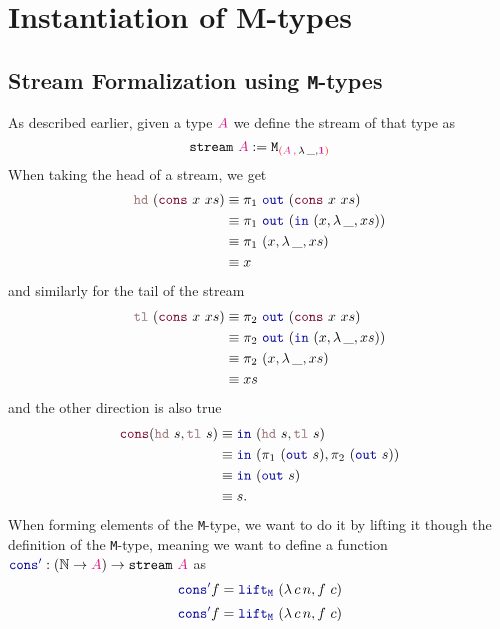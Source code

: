 \documentclass[twoside,11pt,openright]{report}
\theoremstyle{plain} %
\theoremstyle{definition}
\theoremstyle{remark}
\newcommand*{\type}[1]{\textcolor{magenta!90!black}{#1}}
\newcommand*{\containerpair}[2]{\textcolor{red}{(}#1\,\textcolor{red}{,}\,#2\textcolor{red}{)}}
\newcommand*{\unit}{\type{\textbf{1}}}
\newcommand*{\function}[1]{\textcolor{blue!60!black}{\ensuremath{\mathtt{#1}}}}
\newcommand*{\constructor}[1]{\textcolor{purple!60!black}{\ensuremath{\mathtt{#1}}}}
\newcommand*{\destructor}[1]{\textcolor{pink!60!black}{\ensuremath{\mathtt{#1}}}}
\newcommand*{\typeformer}[1]{\ensuremath{\mathtt{#1}}}
\begin{document}

\chapter{Instantiation of M-types}
\section{Stream Formalization using \texttt{M}-types}
As described earlier, given a type \(\type{A}\) we define the stream of that type as
\begin{equation}
  \typeformer{stream}~\type{A} := \typeformer{M}_{\containerpair{\type{A}}{\lambda\,\_,\unit}}
\end{equation}
When taking the head of a stream, we get
\begin{align}
  \destructor{hd}~(\constructor{cons}~x~xs) &\equiv \pi_1~\function{out}~(\constructor{cons}~x~xs) \\
                                       &\equiv \pi_1~\function{out}~(\function{in}~(x , \lambda\,\_,xs)) \\
                                       &\equiv \pi_1~(x , \lambda\,\_,xs) \\
                                       &\equiv x
\end{align}
and similarly for the tail of the stream
\begin{align}
  \destructor{tl}~(\constructor{cons}~x~xs) &\equiv \pi_2~\function{out}~(\constructor{cons}~x~xs) \\
                                       &\equiv \pi_2~\function{out}~(\function{in}~(x , \lambda\,\_,xs)) \\
                                       &\equiv \pi_2~(x , \lambda\,\_,xs) \\
                                       &\equiv xs
\end{align}
and the other direction is also true
\begin{align}
  \constructor{cons}(\destructor{hd}~s , \destructor{tl}~s) &\equiv \function{in}~(\destructor{hd}~s , \destructor{tl}~s) \\
                                                     &\equiv \function{in}~(\pi_1~(\function{out}~s) , \pi_2~(\function{out}~s)) \\
                                                     &\equiv \function{in}~(\function{out}~s) \\
                                                     &\equiv s.
\end{align}
When forming elements of the \texttt{M}-type, we want to do it by lifting it though the definition of the \texttt{M}-type, meaning we want to define a function \(\function{cons'} : (\mathbb{N} \rightarrow \type{A}) \rightarrow \typeformer{stream}~\type{A}\) as
\begin{equation}
  \function{cons'} f = \function{lift_M}~(\lambda\,c\,n, f~c)
\end{equation}
\begin{equation}
  \function{cons'} f = \function{lift_M}~(\lambda\,c\,n, f~c)
\end{equation}
\end{document}
